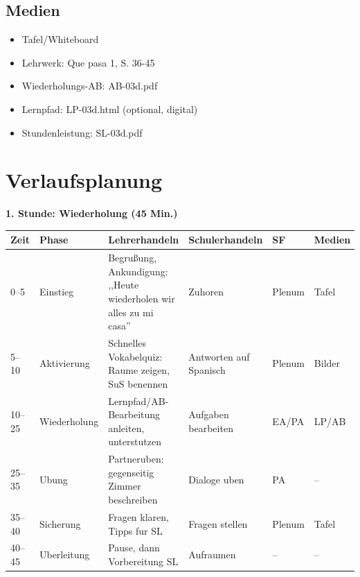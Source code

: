\documentclass[11pt,a4paper]{article}
\newcommand{\lehrwerk}{Que pasa 1}
\newcommand{\lehrwerkseite}{S. 36-45}
\begin{document}
\subsection{Medien}
\begin{itemize}
    \item Tafel/Whiteboard
    \item Lehrwerk: \lehrwerk, \lehrwerkseite
    \item Wiederholungs-AB: AB-03d.pdf
    \item Lernpfad: LP-03d.html (optional, digital)
    \item Stundenleistung: SL-03d.pdf
\end{itemize}

\section{Verlaufsplanung}

\textbf{1. Stunde: Wiederholung (45 Min.)}

\begin{longtable}{|p{1cm}|p{1.5cm}|p{4cm}|p{3cm}|p{2cm}|p{2cm}|}
\hline
\textbf{Zeit} & \textbf{Phase} & \textbf{Lehrerhandeln} & \textbf{Schulerhandeln} & \textbf{SF} & \textbf{Medien} \\
\hline
\endhead

0--5 & Einstieg & Begrußung, Ankun\-digung: ,,Heute wiederholen wir alles zu mi casa'' & Zuhoren & Plenum & Tafel \\
\hline

5--10 & Aktivie\-rung & Schnelles Vokabelquiz: Raume zeigen, SuS benennen & Antworten auf Spanisch & Plenum & Bilder \\
\hline

10--25 & Wieder\-holung & Lernpfad/AB-Bearbeitung anleiten, unterstutzen & Aufgaben bearbeiten & EA/PA & LP/AB \\
\hline

25--35 & Ubung & Partneruben: gegenseitig Zimmer beschreiben & Dialoge uben & PA & -- \\
\hline

35--40 & Sicherung & Fragen klaren, Tipps fur SL & Fragen stellen & Plenum & Tafel \\
\hline

40--45 & Uber\-leitung & Pause, dann Vorbereitung SL & Aufraumen & -- & -- \\
\hline
\end{longtable}
\end{document}
